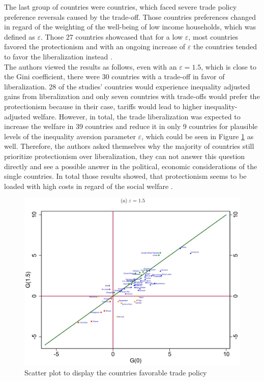 The last group of countries were countries, which faced severe trade policy preference reversals caused by the trade-off. Those
countries preferences changed in regard of the weighting of the well-being of low income households, which was defined as \(\varepsilon\).
Those 27 countries showcased that for a low \(\varepsilon\), most countries favored the protectionism and with an ongoing increase
of \(\varepsilon\) the countries tended to favor the liberalization instead \parencite[pp.~22-24]{Artuc.2019}. \\
The authors viewed the results as follows, even with an \(\varepsilon = 1.5\), which is close to the Gini coefficient,
there were 30 countries with a trade-off in favor of liberalization. 28 of the studies' countries would experience inequality
adjusted gains from liberalization and only seven countries with trade-offs would prefer the protectionism because in their case, 
tariffs would lead to higher inequality-adjusted welfare. However, in total, the trade liberalization was expected to increase 
the welfare in 39 countries and reduce it in only 9 countries for plausible levels of the inequality aversion parameter 
\(\varepsilon\), which could be seen in Figure \ref{fig:tradereso} as well. Therefore, the authors asked themselves why the majority of countries still prioritize protectionism over 
liberalization, they can not answer this question directly and see a possible answer in the political, economic considerations
of the single countries. In total those results showed, that protectionism seems to be loaded with high costs in regard of the 
social welfare \parencite[pp.~24-26]{Artuc.2019}. \\
\begin{figure}[h!]
    \centering
    \includegraphics*[width=\textwidth]{graphics/trade-off-reso.jpg}
    \caption{Scatter plot to display the countries favorable trade policy \parencite[p.~43]{Artuc.2019}}
    \label{fig:tradereso}
\end{figure}\\

